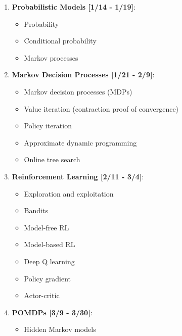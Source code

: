 \documentclass[9pt]{article}
\begin{document}
\begin{enumerate}[noitemsep]
    \item \textbf{Probabilistic Models [1/14 - 1/19]}:
        \begin{multicols}{2}
            \begin{itemize}[noitemsep]
                \item Probability
                \item Conditional probability
                \item Markov processes
            \end{itemize}
        \end{multicols}
    \item \textbf{Markov Decision Processes [1/21 - 2/9]}:
        \begin{multicols}{2}
        \begin{itemize}[noitemsep]
            \item Markov decision processes (MDPs)
            \item Value iteration (contraction proof of convergence)
            \item Policy iteration
            \item Approximate dynamic programming
            \item Online tree search
        \end{itemize}
        \end{multicols}
    \item \textbf{Reinforcement Learning [2/11 - 3/4]}:
        \begin{multicols}{2}
        \begin{itemize}[noitemsep]
            \item Exploration and exploitation
            \item Bandits
            \item Model-free RL
            \item Model-based RL
            \item Deep Q learning
            \item Policy gradient
            \item Actor-critic
        \end{itemize}
        \end{multicols}
    \item \textbf{POMDPs [3/9 - 3/30]}:
        \begin{multicols}{2}
        \begin{itemize}[noitemsep]
            \item Hidden Markov models

\end{itemize}
\end{multicols}
\end{enumerate}
\end{document}
